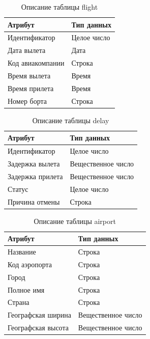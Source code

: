\begin{table}[H]
    \centering
    \captionsetup{justification=centering}
    \caption{Описание таблицы flight}
    \begin{tabular}{|p{}|p{}|}
        \hline
        Атрибут & Тип данных \\
        \hline
        Идентификатор & Целое число \\
        Дата вылета & Дата \\
        Код авиакомпании & Строка \\
        Время вылета & Время \\
        Время прилета & Время \\
        Номер борта & Строка \\
        \hline
    \end{tabular}
    \label{tab:tabl1}
\end{table}

\begin{table}[H]
    \centering
    \captionsetup{justification=centering}
    \caption{Описание таблицы delay}
    \begin{tabular}{|p{}|p{}|}
        \hline
        Атрибут & Тип данных \\
        \hline
        Идентификатор & Целое число \\
        Задержка вылета & Вещественное число \\
        Задержка прилета & Вещественное число \\
        Статус & Целое число \\
        Причина отмены & Строка \\
        \hline
    \end{tabular}
    \label{tab:tabl2}
\end{table}

\begin{table}[H]
    \centering
    \captionsetup{justification=centering}
    \caption{Описание таблицы airport}
    \begin{tabular}{|p{}|p{}|}
        \hline
        Атрибут & Тип данных \\
        \hline
        Название & Строка \\
        Код аэропорта & Строка \\
        Город & Строка \\
        Полное имя & Строка \\
        Страна & Строка \\
        Географская ширина & Вещественное число \\
        Географская высота & Вещественное число \\
        \hline
    \end{tabular}
    \label{tab:tabl3}
\end{table}

